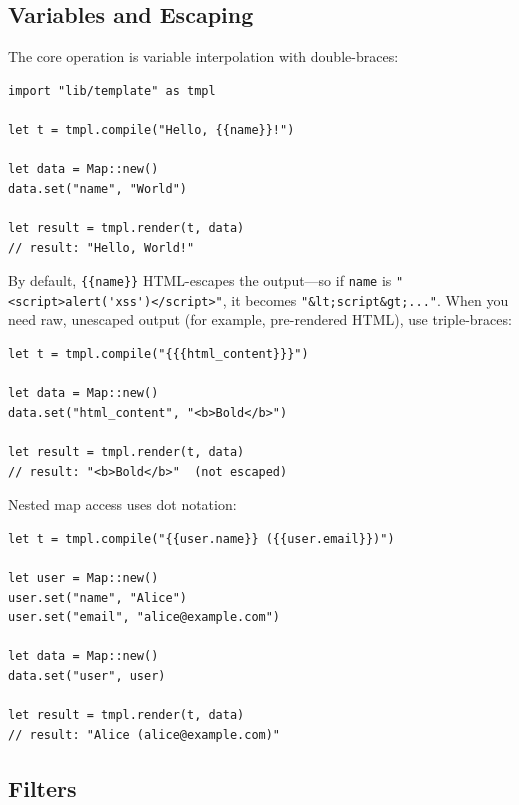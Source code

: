\subsection{Variables and Escaping}\label{sec:template-variables}


The core operation is variable interpolation with double-braces:

\begin{lstlisting}[language=Lattice, caption={Template variable interpolation}]
import "lib/template" as tmpl

let t = tmpl.compile("Hello, {{name}}!")

let data = Map::new()
data.set("name", "World")

let result = tmpl.render(t, data)
// result: "Hello, World!"
\end{lstlisting}

By default, \lstinline|{{name}}| HTML-escapes the output---so if \lstinline|name| is \lstinline|"<script>alert('xss')</script>"|, it becomes \lstinline|"&lt;script&gt;..."|.
When you need raw, unescaped output (for example, pre-rendered HTML), use triple-braces:

\begin{lstlisting}[language=Lattice, caption={Raw vs.\ escaped output}]
let t = tmpl.compile("{{{html_content}}}")

let data = Map::new()
data.set("html_content", "<b>Bold</b>")

let result = tmpl.render(t, data)
// result: "<b>Bold</b>"  (not escaped)
\end{lstlisting}

Nested map access uses dot notation:

\begin{lstlisting}[language=Lattice, caption={Dot notation for nested values}]
let t = tmpl.compile("{{user.name}} ({{user.email}})")

let user = Map::new()
user.set("name", "Alice")
user.set("email", "alice@example.com")

let data = Map::new()
data.set("user", user)

let result = tmpl.render(t, data)
// result: "Alice (alice@example.com)"
\end{lstlisting}

\subsection{Filters}\label{sec:template-filters}

